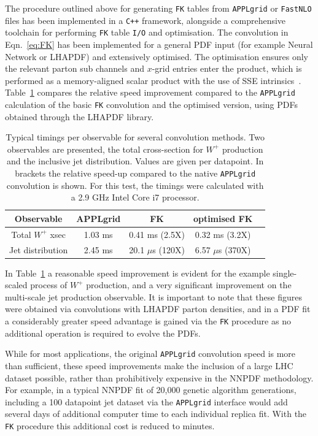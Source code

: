 The procedure outlined above for generating {\tt FK} tables from { \tt APPLgrid} or { \tt FastNLO} files has been implemented in a {\tt C++} framework, alongside a comprehensive toolchain for performing {\tt FK} table {\tt I/O} and optimisation. The convolution in Eqn.~\ref{eq:FK} has been implemented for a general PDF input (for example Neural Network or LHAPDF) and extensively optimised. The optimisation ensures only the relevant parton sub channels and $x$-grid entries enter the product, which is performed as a memory-aligned scalar product with the use of SSE intrinsics~\cite{SSE}.   Table~\ref{tab:FKtimings} compares the relative speed improvement compared to the { \tt APPLgrid} calculation of the basic  {\tt FK} convolution and the optimised version, using PDFs obtained through the LHAPDF library.
\begin{table}[htdp]
\begin{center}
\begin{tabular}{|c|c|c|c|c|}
\hline Observable &APPLgrid & FK & optimised FK \\
\hline Total $W^+$ xsec &1.03 ms & 0.41 ms (2.5X) & 0.32 ms (3.2X) \\
\hline Jet distribution &2.45 ms & 20.1 $\mu$s (120X) & 6.57 $\mu$s (370X) \\ 
\hline
\end{tabular}
\caption[Comparison of { \tt APPLgrid} and {\tt FK} convolution timings]{Typical timings per observable for several convolution methods. Two observables are presented, the total cross-section for $W^+$ production and the inclusive jet \pt  distribution. Values are given per datapoint. In brackets the relative speed-up compared to the native { \tt APPLgrid} convolution is shown. For this test, the timings were calculated with a 2.9 GHz Intel Core i7 processor.}
\end{center}
\label{tab:FKtimings}
\end{table}
\clearpage
In Table~\ref{tab:FKtimings} a reasonable speed improvement is evident for the example single-scaled process of $W^+$ production, and a very significant improvement on the multi-scale jet production observable. It is important to note that these figures were obtained via convolutions with LHAPDF parton densities, and in a PDF fit a considerably greater speed advantage is gained via the {\tt FK} procedure as no additional operation is required to evolve the PDFs.

While for most applications, the original { \tt APPLgrid} convolution speed is more than sufficient, these speed improvements make the inclusion of a large LHC dataset possible, rather than prohibitively expensive in the NNPDF methodology. For example, in a typical NNPDF fit of 20,000 genetic algorithm generations, including a 100 datapoint jet dataset via the { \tt APPLgrid} interface would add several days of additional computer time to each individual replica fit. With the {\tt FK} procedure this additional cost is reduced to minutes.

